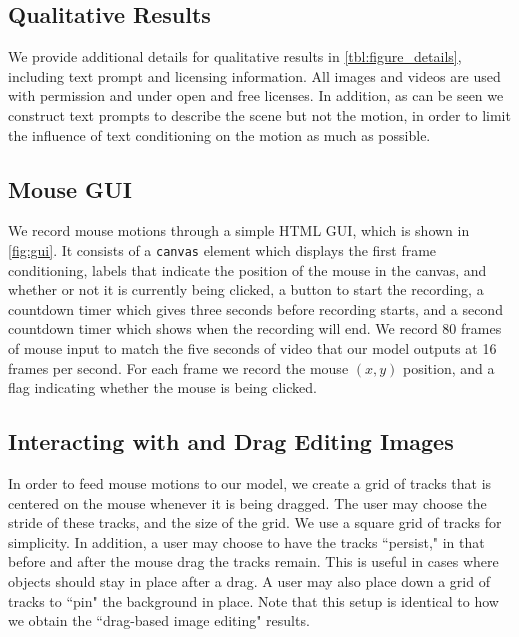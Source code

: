 

\subsection{Qualitative Results}

We provide additional details for qualitative results in \cref{tbl:figure_details}, including text prompt and licensing information. All images and videos are used with permission and under open and free licenses. In addition, as can be seen we construct text prompts to describe the scene but not the motion, in order to limit the influence of text conditioning on the motion as much as possible.

\subsection{Mouse GUI}
\label{apdx:gui}



We record mouse motions through a simple HTML GUI, which is shown in \cref{fig:gui}. It consists of a {\tt canvas} element which displays the first frame conditioning, labels that indicate the position of the mouse in the canvas, and whether or not it is currently being clicked, a button to start the recording, a countdown timer which gives three seconds before recording starts, and a second countdown timer which shows when the recording will end. We record 80 frames of mouse input to match the five seconds of video that our model outputs at 16 frames per second. For each frame we record the mouse $(x, y)$ position, and a flag indicating whether the mouse is being clicked.

\subsection{Interacting with and Drag Editing Images}

In order to feed mouse motions to our model, we create a grid of tracks that is centered on the mouse whenever it is being dragged. The user may choose the stride of these tracks, and the size of the grid. We use a square grid of tracks for simplicity. In addition, a user may choose to have the tracks ``persist," in that before and after the mouse drag the tracks remain. This is useful in cases where objects should stay in place after a drag. A user may also place down a grid of tracks to ``pin" the background in place. Note that this setup is identical to how we obtain the ``drag-based image editing" results.

